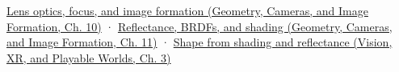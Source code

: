 \href{../03-Geometry-Cameras-and-Image-Formation/main.pdf\#nameddest=03-visual-computing-i-ch003-lens-optics-focus-and-image-formation}{Lens optics, focus, and image formation (Geometry, Cameras, and Image Formation, Ch. 10)} · \href{../03-Geometry-Cameras-and-Image-Formation/main.pdf\#nameddest=03-visual-computing-i-ch004-reflectance-brdfs-and-shading}{Reflectance, BRDFs, and shading (Geometry, Cameras, and Image Formation, Ch. 11)} · \href{../07-Vision-XR-and-Playable-Worlds/main.pdf\#nameddest=04-visual-computing-ii-ch032-shape-from-shading-and-reflectance}{Shape from shading and reflectance (Vision, XR, and Playable Worlds, Ch. 3)}
